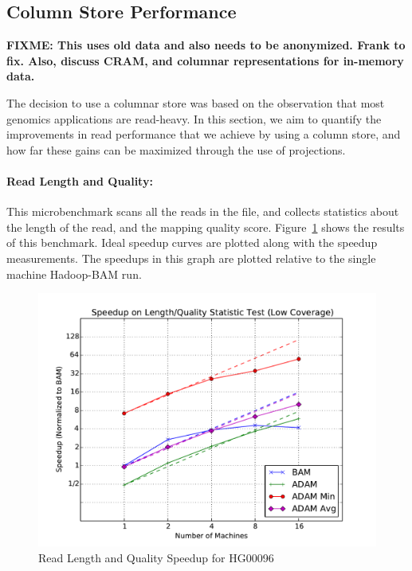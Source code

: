 \documentclass{acm_proc_article-sp}
\begin{document}
\subsection{Column Store Performance}
\label{sec:column-store-perf}

\textbf{FIXME: This uses old data and also needs to be anonymized. Frank to fix. Also, discuss CRAM, and columnar representations for in-memory data.}

The decision to use a columnar store was based on the observation that most genomics applications are read-heavy. In this section,
we aim to quantify the improvements in read performance that we achieve by using a column store, and how far these gains can be
maximized through the use of projections.

\paragraph{Read Length and Quality:}
\label{sec:read-length-and-quality}

This microbenchmark scans all the reads in the file, and collects statistics about the length of the read, and the mapping quality score. Figure~\ref{fig:length-quality} shows
the results of this benchmark. Ideal speedup curves are plotted along with the speedup measurements. The speedups in this graph are plotted relative to the single machine Hadoop-BAM run.

\begin{figure}[h]
\begin{center}
\includegraphics[width=\linewidth]{microbenchmarks/length_and_quality_low_coverage.pdf}
\end{center}
\caption{Read Length and Quality Speedup for HG00096}
\label{fig:length-quality}
\end{figure}
\end{document}
